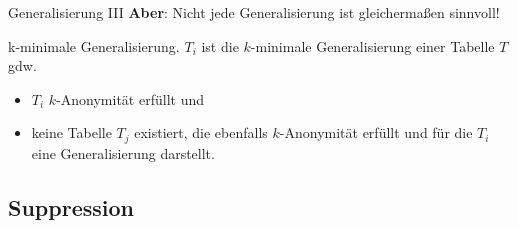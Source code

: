 \begin{frame}{Generalisierung III}
	\textbf{Aber}: Nicht jede Generalisierung ist gleichermaßen sinnvoll!
	\pause
	
%	
	\begin{block}{k-minimale Generalisierung.}
		\(T_i\) ist die \(k\)-minimale Generalisierung einer Tabelle \(T\) gdw.
		\begin{itemize}
			\item \(T_i\) \(k\)-Anonymität erfüllt und
			\item keine Tabelle \(T_j\) existiert, die ebenfalls \(k\)-Anonymität erfüllt und für die \(T_i\) eine Generalisierung darstellt.
		\end{itemize}
	\end{block}
\end{frame}


\subsection{Suppression}


